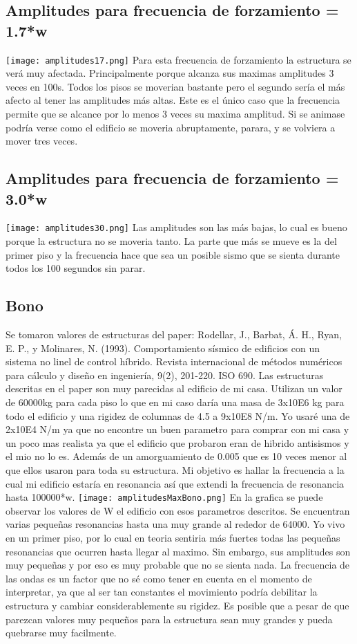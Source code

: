 \documentclass[11pt,letterpaper]{exam}
\begin{document}
\subsection{ Amplitudes para frecuencia de forzamiento = 1.7*w}
\texttt{[image: amplitudes17.png]}
Para esta frecuencia de forzamiento la estructura se verá muy afectada. Principalmente porque alcanza sus maximas amplitudes 3 veces en 100s. Todos los pisos se moverian bastante pero el segundo sería el más afecto al tener las amplitudes más altas. Este es el único caso que la frecuencia permite que se alcance por lo menos 3 veces su maxima amplitud. Si se animase podría verse como el edificio se moveria abruptamente, parara, y se volviera a mover tres veces.


\subsection{ Amplitudes para frecuencia de forzamiento = 3.0*w}
\texttt{[image: amplitudes30.png]}
Las amplitudes son las más bajas, lo cual es bueno porque la estructura no se moveria tanto. La parte que más se mueve es la del primer piso y la frecuencia hace que sea un posible sismo que se sienta durante todos los 100 segundos sin parar.

\subsection{ Bono}
Se tomaron valores de estructuras del paper: Rodellar, J., Barbat, Á. H., Ryan, E. P., y Molinares, N. (1993). Comportamiento sísmico de edificios con un sistema no linel de control híbrido. Revista internacional de métodos numéricos para cálculo y diseño en ingeniería, 9(2), 201-220.
ISO 690. Las estructuras descritas en el paper son muy parecidas al edificio de mi casa. Utilizan un valor de 60000kg para cada piso lo que en mi caso daría una masa de 3x10E6 kg para todo el edificio y una rigidez de columnas de 4.5 a 9x10E8 N/m. Yo usaré una de 2x10E4 N/m ya que no encontre un buen parametro para comprar con mi casa y un poco mas realista ya que el edificio que probaron eran de hibrido antisismos y el mio no lo es. Además de un amorguamiento de 0.005 que es 10 veces menor al que ellos usaron para toda su estructura.
Mi objetivo es hallar la frecuencia a la cual mi edificio estaría en resonancia así que extendi la frecuencia de resonancia hasta 100000*w.
\texttt{[image: amplitudesMaxBono.png]}
En la grafica se puede observar los valores de W  el edificio con esos parametros descritos. Se encuentran varias pequeñas resonancias hasta una muy grande al rededor de 64000. Yo vivo en un primer piso, por lo cual en teoria sentiria más fuertes todas las pequeñas resonancias que ocurren hasta llegar al maximo. Sin embargo, sus amplitudes son muy pequeñas y por eso es muy probable que no se sienta nada. La frecuencia de las ondas es un factor que no sé como tener en cuenta en el momento de interpretar, ya que al ser tan constantes el movimiento podría debilitar la estructura y cambiar considerablemente su rigidez. Es posible que a pesar de que parezcan valores muy pequeños para la estructura sean muy grandes y pueda quebrarse muy facilmente.
\end{document}
